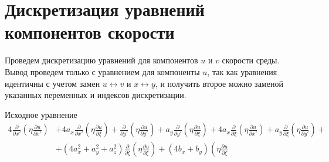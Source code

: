 \section*{Дискретизация уравнений компонентов скорости}

Проведем дискретизацию уравнений для компонентов $u$ и $v$
скорости среды. Вывод проведем только с уравнением для
компоненты $u$, так как уравнения идентичны с учетом замен
$u \leftrightarrow v$ и $x \leftrightarrow y$, и получить
второе можно заменой указанных переменных и индексов
дискретизации.

Исходное уравнение
\begin{equation*}
    \begin{split}
        4
        \frac
            {\partial }
            {\partial x'}
        \left(
            \eta
            \frac
                {\partial u}
                {\partial x'}
        \right)
        &
        +
        4
        a_x
        \frac
            {\partial }
            {\partial x'}
        \left(
            \eta
            \frac
                {\partial u}
                {\partial \xi}
        \right)
        +
        \frac
            {\partial }
            {\partial y'}
        \left(
            \eta
            \frac
                {\partial u}
                {\partial y'}
        \right)
        +
        a_y
        \frac
            {\partial }
            {\partial y'}
        \left(
            \eta
            \frac
                {\partial u}
                {\partial \xi}
        \right)
        +
        4
        a_x
        \frac
            {\partial }
            {\partial \xi}
        \left(
            \eta
            \frac
                {\partial u}
                {\partial x'}
        \right)
        +
        a_y
        \frac
            {\partial }
            {\partial \xi}
        \left(
            \eta
            \frac
                {\partial u}
                {\partial y'}
        \right)
        +
        \\
        &
        +
        \left(
            4
            a^2_x
            +
            a^2_y
            +
            a^2_z
        \right)
        \frac
            {\partial }
            {\partial \xi}
        \left(
            \eta
            \frac
                {\partial u}
                {\partial \xi}
        \right)
        +
        \left(
            4
            b_x
            +
            b_y
        \right)
        \left(
            \eta
            \frac
                {\partial u}
                {\partial \xi}

\end{split}
\end{equation*}
